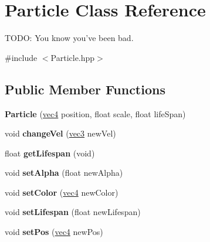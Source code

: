 \hypertarget{class_particle}{\section{Particle Class Reference}
\label{class_particle}
}


T\-O\-D\-O\-: You know you've been bad.  




{\ttfamily \#include $<$Particle.\-hpp$>$}

\subsection*{Public Member Functions}
\begin{DoxyCompactItemize}
\item 
\hypertarget{class_particle_a5530a89bc36834f77eb45483f3c82942}{{\bfseries Particle} (\hyperlink{struct_angel_1_1vec4}{vec4} position, float scale, float life\-Span)}\label{class_particle_a5530a89bc36834f77eb45483f3c82942}

\item 
\hypertarget{class_particle_a4a4f4e73bbfe512c947e3ddb5c7b765c}{void {\bfseries change\-Vel} (\hyperlink{struct_angel_1_1vec3}{vec3} new\-Vel)}\label{class_particle_a4a4f4e73bbfe512c947e3ddb5c7b765c}

\item 
\hypertarget{class_particle_a65eb1712f7dffd24c9a795020408cb99}{float {\bfseries get\-Lifespan} (void)}\label{class_particle_a65eb1712f7dffd24c9a795020408cb99}

\item 
\hypertarget{class_particle_a3d339beee1c13eb3d1eed69d14715106}{void {\bfseries set\-Alpha} (float new\-Alpha)}\label{class_particle_a3d339beee1c13eb3d1eed69d14715106}

\item 
\hypertarget{class_particle_a8dbaf5f085a47c834c02f0531ccdbae1}{void {\bfseries set\-Color} (\hyperlink{struct_angel_1_1vec4}{vec4} new\-Color)}\label{class_particle_a8dbaf5f085a47c834c02f0531ccdbae1}

\item 
\hypertarget{class_particle_a2f59e88a58a6c6ea766ab4c94c75c2b3}{void {\bfseries set\-Lifespan} (float new\-Lifespan)}\label{class_particle_a2f59e88a58a6c6ea766ab4c94c75c2b3}

\item 
\hypertarget{class_particle_aabc36f29b35e0e1e5c6d6fb926bb7bbb}{void {\bfseries set\-Pos} (\hyperlink{struct_angel_1_1vec4}{vec4} new\-Pos)}\label{class_particle_aabc36f29b35e0e1e5c6d6fb926bb7bbb}


\end{DoxyCompactItemize}
